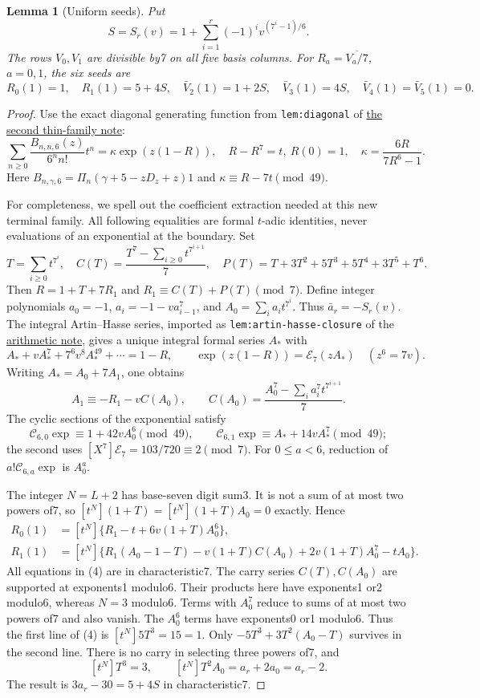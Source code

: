 \documentclass[11pt]{article}
\newtheorem{lemma}{Lemma}
\begin{document}
\begin{lemma}[Uniform seeds]\label{lem:seeds}
Put
\[
 S=S_r(v)=1+\sum_{i=1}^r(-1)^i v^{(7^i-1)/6}.
\]
The rows $V_0,V_1$ are divisible by7 on all five basis columns.
For $R_a=\overline{V_a/7}$, $a=0,1$, the six seeds are
\[
 R_0(1)=1,\quad R_1(1)=5+4S,\quad
 \bar V_2(1)=1+2S,\quad \bar V_3(1)=4S,\quad
                         \bar V_4(1)=\bar V_5(1)=0.           \tag{2}
\]
\end{lemma}
\begin{proof}
Use the exact diagonal generating function from
\texttt{lem:diagonal} of
\href{GAP_SIX_TWO_POWER_PLUS_ONE_SFC.tex}
{the second thin-family note}:
\[
 \sum_{n\ge0}\frac{B_{n,n,6}(z)}{6^nn!}t^n
   =\kappa\exp(z(1-R)),\quad
 R-R^7=t,\ R(0)=1,\quad\kappa=\frac{6R}{7R^6-1}.
                                                               \tag{3}
\]
Here $B_{n,\gamma,6}=\Pi_n(\gamma+5-zD_z+z)1$ and
$\kappa\equiv R-7t\pmod{49}$.

For completeness, we spell out the coefficient extraction needed
at this new terminal family. All following equalities are formal
$t$-adic identities, never evaluations of an exponential at the
boundary. Set
\[
 T=\sum_{i\ge0}t^{7^i},\quad
 C(T)=\frac{T^7-\sum_{i\ge0}t^{7^{i+1}}}{7},\quad
 P(T)=T+3T^2+5T^3+5T^4+3T^5+T^6.
\]
Then $R=1+T+7R_1$ and $R_1\equiv C(T)+P(T)\pmod7$.
Define integer polynomials
$a_0=-1$, $a_i=-1-va_{i-1}^7$, and
$A_0=\sum_i a_it^{7^i}$.
Thus $\bar a_r=-S_r(v)$.
The integral Artin--Hasse series, imported as
\texttt{lem:artin-hasse-closure} of the
\href{ARITHMETIC_FRONTIER_TERMINAL_ORDERS.tex}
{arithmetic note}, gives a unique integral formal series $A_*$ with
\[
 A_*+vA_*^7+7^6v^8A_*^{49}+\cdots=1-R,\qquad
 \exp(z(1-R))=\mathcal E_7(zA_*)\quad(z^6=7v).
\]
Writing $A_*=A_0+7A_1$, one obtains
\[
 A_1\equiv-R_1-vC(A_0),\qquad
 C(A_0)=\frac{A_0^7-\sum_i a_i^7t^{7^{i+1}}}{7}.
\]
The cyclic sections of the exponential satisfy
\[
 \mathcal C_{6,0}\exp\equiv1+42vA_0^6\pmod{49},\qquad
 \mathcal C_{6,1}\exp\equiv A_*+14vA_*^7\pmod{49};
\]
the second uses $[X^7]\mathcal E_7=103/720\equiv2\pmod7$.
For $0\le a<6$, reduction of $a!\mathcal C_{6,a}\exp$ is $A_0^a$.

The integer $N=L+2$ has base-seven digit sum3.
It is not a sum of at most two powers of7, so
$[t^N](1+T)=[t^N](1+T)A_0=0$ exactly. Hence
\[
 \begin{split}
 R_0(1)&=[t^N]\{R_1-t+6v(1+T)A_0^6\},\\
 R_1(1)&=[t^N]\{R_1(A_0-1-T)-v(1+T)C(A_0)
                           +2v(1+T)A_0^7-tA_0\}.
 \end{split}                                                   \tag{4}
\]
All equations in (4) are in characteristic7.
The carry series $C(T),C(A_0)$ are supported at exponents1 modulo6.
Their products here have exponents1 or2 modulo6, whereas $N=3$
modulo6. Terms with $A_0^7$ reduce to sums of at most two powers
of7 and also vanish. The $A_0^6$ terms have exponents0 or1 modulo6.
Thus the first line of (4) is $[t^N]5T^3=15=1$.
Only $-5T^3+3T^2(A_0-T)$ survives in the second line.
There is no carry in selecting three powers of7, and
\[
 [t^N]T^3=3,\qquad [t^N]T^2A_0=a_r+2a_0=a_r-2.
\]
The result is $3a_r-30=5+4S$ in characteristic7.


\end{proof}
\end{document}
